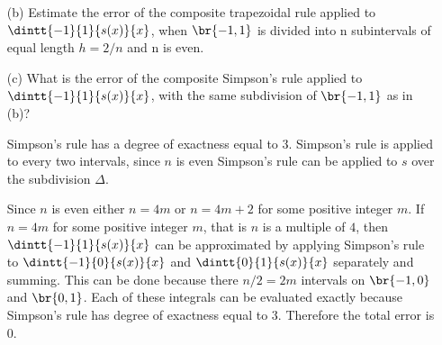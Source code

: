 \documentclass[11pt]{article}
\begin{document}
\begin{enumerate}
\begin{enumerate}
        \item[(b)] %
            Estimate the error of the composite trapezoidal rule applied to 
            $\dintt{-1}{1}{s(x)}{x}$, when $\br{-1, 1}$ is divided into n
            subintervals of equal length $h = 2/n$ and n is even.

            

        \item[(c)]
            What is the error of the composite Simpson’s rule applied to
            $\dintt{-1}{1}{s(x)}{x}$, with the same subdivision of
            $\br{-1, 1}$ as in (b)?

            Simpson's rule has a degree of exactness equal to 3.
            Simpson's rule is applied to every two intervals, since $n$ is
            even Simpson's rule can be applied to $s$ over the subdivision
            $\Delta$.

            Since $n$ is even either $n = 4m$ or $n = 4m + 2$ for some positive
            integer $m$.
            If $n = 4m$ for some positive integer $m$, that is $n$ is a multiple
            of $4$, then $\dintt{-1}{1}{s(x)}{x}$ can be approximated by
            applying Simpson's rule to $\dintt{-1}{0}{s(x)}{x}$ and 
            $\dintt{0}{1}{s(x)}{x}$ separately and summing.
            This can be done because there $n/2 = 2m$ intervals on $\br{-1, 0}$ and
            $\br{0,1}$.
            Each of these integrals can be evaluated exactly because Simpson's rule
            has degree of exactness equal to 3.
            Therefore the total error is 0.


\end{enumerate}
\end{enumerate}
\end{document}
